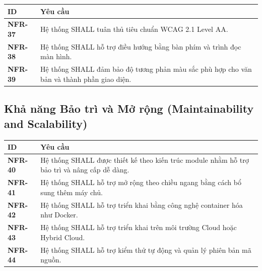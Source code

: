 \documentclass[12pt, a4paper]{article}
\begin{document}
\begin{table}[H]
    \centering
    \renewcommand{\arraystretch}{1.3}

    \begin{tabularx}{\textwidth}{|l|X|}
        \hline
        \rowcolor{gray!10}
        \textbf{ID}     & \textbf{Yêu cầu}                                                                          \\
        \hline
        \textbf{NFR-37} & Hệ thống SHALL tuân thủ tiêu chuẩn WCAG 2.1 Level AA.                                     \\
        \hline
        \textbf{NFR-38} & Hệ thống SHALL hỗ trợ điều hướng bằng bàn phím và trình đọc màn hình.                     \\
        \hline
        \textbf{NFR-39} & Hệ thống SHALL đảm bảo độ tương phản màu sắc phù hợp cho văn bản và thành phần giao diện. \\
        \hline
    \end{tabularx}

\end{table}

\subsection{Khả năng Bảo trì và Mở rộng (Maintainability and Scalability)}

\begin{table}[H]
    \centering
    \renewcommand{\arraystretch}{1.3}

    \begin{tabularx}{\textwidth}{|l|X|}
        \hline
        \rowcolor{gray!10}
        \textbf{ID}     & \textbf{Yêu cầu}                                                                            \\
        \hline
        \textbf{NFR-40} & Hệ thống SHALL được thiết kế theo kiến trúc module nhằm hỗ trợ bảo trì và nâng cấp dễ dàng. \\
        \hline
        \textbf{NFR-41} & Hệ thống SHALL hỗ trợ mở rộng theo chiều ngang bằng cách bổ sung thêm máy chủ.              \\
        \hline
        \textbf{NFR-42} & Hệ thống SHALL hỗ trợ triển khai bằng công nghệ container hóa như Docker.                   \\
        \hline
        \textbf{NFR-43} & Hệ thống SHALL hỗ trợ triển khai trên môi trường Cloud hoặc Hybrid Cloud.                   \\
        \hline
        \textbf{NFR-44} & Hệ thống SHALL hỗ trợ kiểm thử tự động và quản lý phiên bản mã nguồn.                       \\
        \hline
    \end{tabularx}

\end{table}
\end{document}
